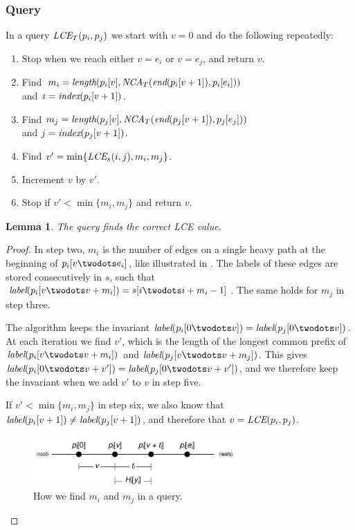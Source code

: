 \documentclass[a4]{article}
\newcommand*{\pref}{\prettyref}
\newtheorem{lemma}{Lemma}
\begin{document}
\subsubsection{Query}

In a  query $\textit{LCE}_T(p_i,p_j)$ we start with $v=0$ and do the following repeatedly:
\begin{enumerate}
\item Stop when we reach either $v=e_i$ or $v=e_j$, and return $v$.
\item Find $m_i = \textit{length}(p_i[v], \textit{NCA}_T(\textit{end}(p_i[v+1]), p_i[e_i]))$ \\ and $i=\textit{index}(p_i[v+1])$.
\item Find $m_j = \textit{length}(p_j[v], \textit{NCA}_T(\textit{end}(p_j[v+1]), p_j[e_j]))$ \\ and $j=\textit{index}(p_j[v+1])$.
\item Find $v'=\min\{\textit{LCE}_s(i,j),m_i,m_j\}$.
\item Increment $v$ by $v'$.
\item Stop if $v'<\min\{m_i,m_j\}$ and return $v$.
\end{enumerate}

\begin{lemma}
The  query finds the correct LCE value.
\end{lemma}
\begin{proof}
In step two, $m_i$ is the number of edges on a single heavy path at the beginning of $p_i[v\twodots e_i]$, like illustrated in \pref{fig:tree-heavy-query}. The labels of these edges are stored consecutively in $s$, such that $\zlabel(p_i[v\twodots v+m_i])=s[i\twodots i + m_i-1]$. The same holds for $m_j$ in step three.

The algorithm keeps the invariant $\zlabel(p_i[0\twodots v]) = \zlabel(p_j[0\twodots v])$. At each iteration we find $v'$, which is the length of the longest common prefix of $\zlabel(p_i[v\twodots v+m_i])$ and $\zlabel(p_j[v\twodots v+m_j])$. This gives $\zlabel(p_i[0\twodots v+v']) = \\\zlabel(p_j[0\twodots v+v'])$, and we therefore keep the invariant when we add $v'$ to $v$ in step five.

If $v'<\min\{m_i,m_j\}$ in step six, we also know that $\textit{label}(p_i[v+1]) \neq \textit{label}(p_j[v+1])$, and therefore that $v=\textit{LCE}(p_i,p_j)$.

\begin{figure}[tp]
    \begin{center}
        \includegraphics[width=0.7\textwidth,page=2]{tree-fingerprint.pdf}
    \end{center}
    \caption{\label{fig:tree-heavy-query}How we find $m_i$ and $m_j$ in a  query.}
\end{figure}
\end{proof}
\end{document}

